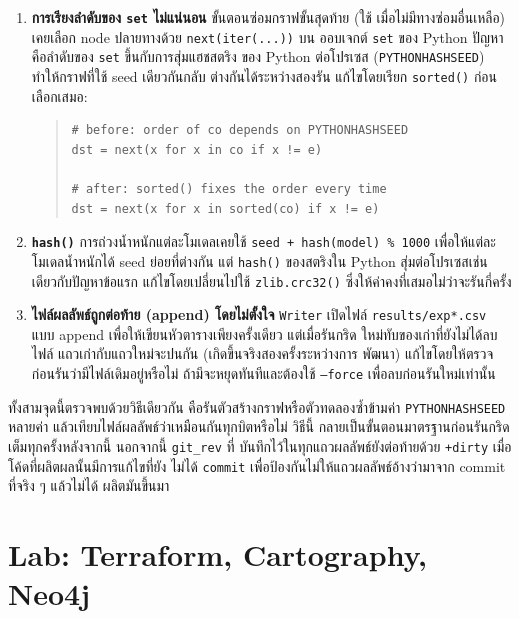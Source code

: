 \begin{enumerate}[leftmargin=1.6em]
\item \textbf{การเรียงลำดับของ \texttt{set} ไม่แน่นอน} ขั้นตอนซ่อมกราฟขั้นสุดท้าย (ใช้
เมื่อไม่มีทางซ่อมอื่นเหลือ) เคยเลือก node ปลายทางด้วย \texttt{next(iter(...))} บน
ออบเจกต์ \texttt{set} ของ Python ปัญหาคือลำดับของ \texttt{set} ขึ้นกับการสุ่มแฮชสตริง
ของ Python ต่อโปรเซส (\texttt{PYTHONHASHSEED}) ทำให้กราฟที่ใช้ seed เดียวกันกลับ
ต่างกันได้ระหว่างสองรัน แก้ไขโดยเรียก \texttt{sorted()} ก่อนเลือกเสมอ:

\begin{quote}\small\begin{verbatim}
# before: order of co depends on PYTHONHASHSEED
dst = next(x for x in co if x != e)

# after: sorted() fixes the order every time
dst = next(x for x in sorted(co) if x != e)
\end{verbatim}\end{quote}
\item \textbf{\texttt{hash()}} การถ่วงน้ำหนักแต่ละโมเดลเคยใช้ \texttt{seed +
hash(model) \% 1000} เพื่อให้แต่ละโมเดลน้ำหนักได้ seed ย่อยที่ต่างกัน แต่ \texttt{hash()}
ของสตริงใน Python สุ่มต่อโปรเซสเช่นเดียวกับปัญหาข้อแรก แก้ไขโดยเปลี่ยนไปใช้
\texttt{zlib.crc32()} ซึ่งให้ค่าคงที่เสมอไม่ว่าจะรันกี่ครั้ง
\item \textbf{ไฟล์ผลลัพธ์ถูกต่อท้าย (append) โดยไม่ตั้งใจ} \texttt{Writer} เปิดไฟล์
\texttt{results/exp*.csv} แบบ append เพื่อให้เขียนหัวตารางเพียงครั้งเดียว แต่เมื่อรันกริด
ใหม่ทับของเก่าที่ยังไม่ได้ลบไฟล์ แถวเก่ากับแถวใหม่จะปนกัน (เกิดขึ้นจริงสองครั้งระหว่างการ
พัฒนา) แก้ไขโดยให้ตรวจก่อนรันว่ามีไฟล์เดิมอยู่หรือไม่ ถ้ามีจะหยุดทันทีและต้องใช้
\texttt{--force} เพื่อลบก่อนรันใหม่เท่านั้น
\end{enumerate}

ทั้งสามจุดนี้ตรวจพบด้วยวิธีเดียวกัน คือรันตัวสร้างกราฟหรือตัวทดลองซ้ำข้ามค่า
\texttt{PYTHONHASHSEED} หลายค่า แล้วเทียบไฟล์ผลลัพธ์ว่าเหมือนกันทุกบิตหรือไม่ วิธีนี้
กลายเป็นขั้นตอนมาตรฐานก่อนรันกริดเต็มทุกครั้งหลังจากนี้ นอกจากนี้ \texttt{git\_rev} ที่
บันทึกไว้ในทุกแถวผลลัพธ์ยังต่อท้ายด้วย \texttt{+dirty} เมื่อโค้ดที่ผลิตผลนั้นมีการแก้ไขที่ยัง
ไม่ได้ \texttt{commit} เพื่อป้องกันไม่ให้แถวผลลัพธ์อ้างว่ามาจาก commit ที่จริง ๆ แล้วไม่ได้
ผลิตมันขึ้นมา

\section{Lab: Terraform, Cartography, Neo4j}\label{sec:impl-lab}

